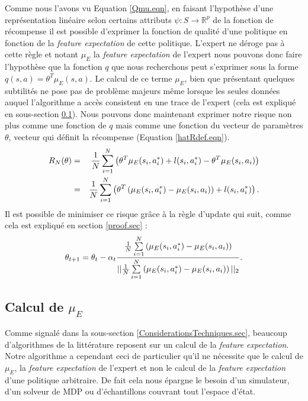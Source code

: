 \documentclass[publibook-draft]{CAp2012}
\begin{document}
Comme nous l'avons vu Equation \ref{Qmu.eqn}, en faisant l'hypothèse d'une représentation linéaire selon certains attributs $\psi : S\rightarrow \mathbb{R}^p$ de la fonction de récompense il est possible d'exprimer la fonction de qualité d'une politique en fonction de la {\it feature expectation} de cette politique. L'expert ne déroge pas à cette règle et notant $\mu_E$ la {\it feature expectation} de l'expert nous pouvons donc faire l'hypothèse que la fonction $q$ que nous recherchons peut s'exprimer sous la forme $q(s,a) = \theta^T\mu_E(s,a)$. Le calcul de ce terme $\mu_E$, bien que présentant quelques subtilités ne pose pas de problème majeurs même lorsque les seules données auquel l'algorithme a accès consistent en une trace de l'expert (cela est expliqué en sous-section \ref{calculmu.sec}). Nous pouvons donc maintenant exprimer notre risque non plus comme une fonction de $q$ mais comme une fonction du vecteur de paramètres $\theta$, vecteur qui définit la récompense (Equation \ref{hatRdef.eqn}).
   \begin{eqnarray}
   R_N(\theta) &=& {1\over N} \sum_{i=1}^N\left(\theta ^T \mu_E(s_i,a^*_i) + l(s_i,a^*_i) - \theta ^T \mu_E(s_i,a_i) \right)\\
   &=& {1\over N} \sum_{i=1}^N\left(\theta^T\left(\mu_E(s_i,a^*_i) - \mu_E(s_i,a_i)\right) + l(s_i,a^*_i)  \right).
   \end{eqnarray}
   Il est possible de minimiser ce risque grâce à la règle d'update qui suit, comme cela est expliqué en section \ref{proof.sec} :
   \begin{equation}
   \theta_{t+1} = \theta_t -\alpha_t{{1\over N}\sum\limits_{i=1}^N\left(\mu_E(s_i,a^*_i) - \mu_E(s_i,a_i)\right)\over ||{1\over N}\sum\limits_{i=1}^N\left(\mu_E(s_i,a^*_i) - \mu_E(s_i,a_i)\right)||_2}.
   \end{equation}
\subsection{Calcul de $\mu_E$}
\label{calculmu.sec}
Comme signalé dans la sous-section \ref{ConsiderationsTechniques.sec}, beaucoup d'algorithmes de la littérature reposent sur un calcul de la {\it feature expectation}. Notre algorithme a cependant ceci de particulier qu'il ne nécessite que le calcul de $\mu_E$, la {\it feature expectation} de l'expert et non le calcul de la {\it feature expectation} d'une politique arbitraire. De fait cela nous épargne le besoin d'un simulateur, d'un solveur de MDP ou d'échantillons couvrant tout l'espace d'état.\\
\end{document}
